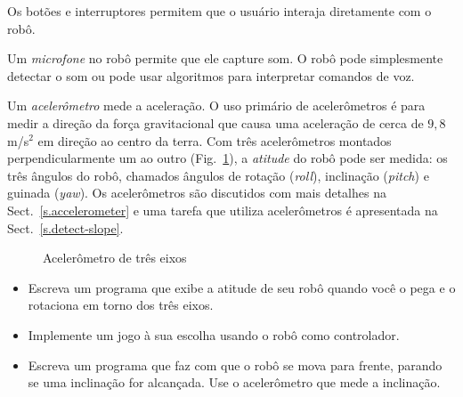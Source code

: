 Os botões e interruptores permitem que o usuário interaja diretamente com o robô.

Um \emph{microfone} no robô permite que ele capture som. O robô pode simplesmente detectar o som ou pode usar algoritmos para interpretar comandos de voz.

Um \emph{acelerômetro} mede a aceleração. O uso primário de acelerômetros é para medir a direção da força gravitacional que causa uma aceleração de cerca de $9,8$ m/s$^{2}$ em direção ao centro da terra. Com três acelerômetros montados perpendicularmente um ao outro (Fig.~\ref{fig.accel}), a \emph{atitude} do robô pode ser medida: os três ângulos do robô, chamados ângulos de rotação (\emph{roll}), inclinação (\emph{pitch}) e guinada (\emph{yaw}). Os acelerômetros são discutidos com mais detalhes na Sect.~\ref{s.accelerometer} e uma tarefa que utiliza acelerômetros é apresentada na Sect.~\ref{s.detect-slope}.

\begin{figure}
\begin{center}
\caption{Acelerômetro de três eixos}\label{fig.accel}
\end{center}
\end{figure}

\begin{framed}

\begin{itemize}
\item Escreva um programa que exibe a atitude de seu robô quando você o pega e o rotaciona em torno dos três eixos.

\item Implemente um jogo à sua escolha usando o robô como controlador.

\item Escreva um programa que faz com que o robô se mova para frente, parando se uma inclinação for alcançada. Use o acelerômetro que mede a inclinação.
\end{itemize}
\end{framed}


